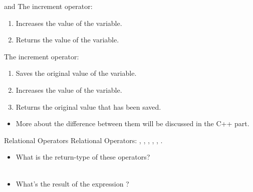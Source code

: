 \documentclass[handout]{beamer}
\begin{document}
\begin{frame}[fragile]{\ttt{++} and \ttt{--}}
    The  increment operator:
    \begin{enumerate}
        \item Increases the value of the variable.
        \item Returns the value of the variable.
    \end{enumerate}
    \pause
    The  increment operator:
    \begin{enumerate}
        \item Saves the original value of the variable.
        \item Increases the value of the variable.
        \item Returns the original value that has been saved.
    \end{enumerate}
    \pause
    \begin{itemize}
        \item More about the difference between them will be discussed in the C++ part.
    \end{itemize}
\end{frame}

\begin{frame}{Relational Operators}
    Relational Operators: \ttt{<}, \ttt{<=}, \ttt{>}, \ttt{>=}, \redtt{==}, \ttt{!=}.
    \begin{itemize}
        \item What is the return-type of these operators?\\
        \pause
        \\
        \pause
        \item What's the result of the expression ?\\
        \pause
    \end{itemize}
\end{frame}
\end{document}
